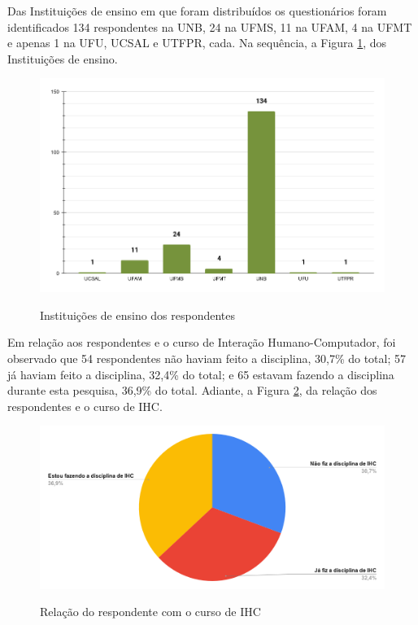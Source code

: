 \begin{apendicesenv}
Das Instituições de ensino  em que foram distribuídos os questionários foram identificados 134 respondentes na UNB, 24 na UFMS, 11 na UFAM, 4 na UFMT e apenas 1 na UFU, UCSAL e UTFPR, cada. Na sequência, a Figura \ref{Fig:campus.png}, dos Instituições de ensino.

\begin{figure}[htbp]
	\centering
	\caption{Instituições de ensino dos respondentes}
	\includegraphics[keepaspectratio=true,scale=0.5]{figuras/apendice/graficos_survey/campus.png}
	\label{Fig:campus.png}
\end{figure}

Em relação aos respondentes e o curso de Interação Humano-Computador, foi observado que 54 respondentes não haviam feito a disciplina, 30,7\% do total; 57 já haviam feito a disciplina, 32,4\% do total; e 65 estavam fazendo a disciplina durante esta pesquisa, 36,9\% do total. Adiante, a Figura \ref{Fig:curso.png}, da relação dos respondentes e o curso de IHC.

\begin{figure}[htbp]
	\centering
	\caption{Relação do respondente com o curso de IHC}
	\includegraphics[keepaspectratio=true,scale=0.4]{figuras/apendice/graficos_survey/curso.png}
	\label{Fig:curso.png}
\end{figure}
    

\end{apendicesenv}
